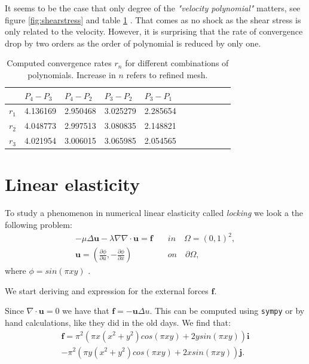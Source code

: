 \documentclass[11pt,a4paper,english]{article}
\numberwithin{equation}{section}
\begin{document}
It seems to be the case that only degree of the \emph{"velocity polynomial"} matters, see figure \ref{fig:shearstress} and table \ref{tab:shear} . That comes as no shock as the shear stress is only related to the velocity. However, it is surprising that the rate of convergence drop by two orders as the order of polynomial is reduced by only one. 


\begin{table}[H]
\centering
\caption{Computed convergence rates $r_n$ for different combinations of polynomials. Increase in $n$ refers to refined mesh. }
\vspace{3mm}
\begin{tabular}{|l|l|l|l|l|l|l|l|l|l|l|}
\hline
 & $P_4-P_3$ & $P_4-P_2$ & $P_3-P_2$ & $P_3-P_1$ \\
\hline
$r_1$ & 4.136169 & 2.950468 & 3.025279 & 2.285654 \\
\hline
$r_2$ & 4.048773 & 2.997513 & 3.080835 & 2.148821 \\
\hline
$r_3$ & 4.021954 & 3.006015 & 3.065985 & 2.054565 \\
\hline
\end{tabular}
\label{tab:shear}
\end{table}

\newpage


\section{Linear elasticity}

To study a phenomenon in numerical linear elasticity called \emph{locking} we look a the following problem:
\begin{align}
-\mu \Delta \mathbf{u} - \lambda \nabla \nabla \cdot \mathbf{u} = \mathbf{f} \quad &in \quad \Omega=(0,1)^2 , \\
\mathbf{u} = \left( \frac{\partial \phi}{\partial u} , -\frac{\partial \phi}{\partial x} \right) \quad &on \quad \partial \Omega ,
\end{align}
where $\phi = sin(\pi x y)$ .

We start deriving and expression for the external forces $\mathbf{f}$.

Since $\nabla \cdot \mathbf{u} = 0$ we have that $\mathbf{f} = - \mathbf{u} \Delta u$. This can be computed using \texttt{sympy} or by hand calculations, like they did in the old days. We find that:
\begin{align*}
\mathbf{f} =  \pi^2(\pi x (x^2+y^2)cos(\pi xy)+ 2y sin(\pi x y)) \mathbf{i} \\ -\pi^2(\pi y(x^2+y^2)cos(\pi xy)+2x sin(\pi xy))\mathbf{j}.
\end{align*}
\end{document}
